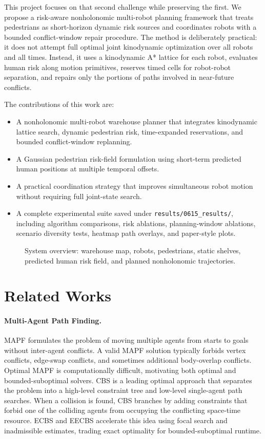 \documentclass[10pt,twocolumn,letterpaper]{article}
\begin{document}
This project focuses on that second challenge while preserving the first. We propose a risk-aware nonholonomic multi-robot planning framework that treats pedestrians as short-horizon dynamic risk sources and coordinates robots with a bounded conflict-window repair procedure. The method is deliberately practical: it does not attempt full optimal joint kinodynamic optimization over all robots and all times. Instead, it uses a kinodynamic A* lattice for each robot, evaluates human risk along motion primitives, reserves timed cells for robot-robot separation, and repairs only the portions of paths involved in near-future conflicts.

The contributions of this work are:
\begin{itemize}
    \item A nonholonomic multi-robot warehouse planner that integrates kinodynamic lattice search, dynamic pedestrian risk, time-expanded reservations, and bounded conflict-window replanning.
    \item A Gaussian pedestrian risk-field formulation using short-term predicted human positions at multiple temporal offsets.
    \item A practical coordination strategy that improves simultaneous robot motion without requiring full joint-state search.
    \item A complete experimental suite saved under \texttt{results/0615\_results/}, including algorithm comparisons, risk ablations, planning-window ablations, scenario diversity tests, heatmap path overlays, and paper-style plots.
\end{itemize}

\begin{figure}[t]
    \centering
    \caption{System overview: warehouse map, robots, pedestrians, static shelves, predicted human risk field, and planned nonholonomic trajectories.}
    \label{fig:system_overview}
\end{figure}

\section{Related Works}
\paragraph{Multi-Agent Path Finding.}
MAPF formulates the problem of moving multiple agents from starts to goals without inter-agent conflicts. A valid MAPF solution typically forbids vertex conflicts, edge-swap conflicts, and sometimes additional body-overlap conflicts. Optimal MAPF is computationally difficult, motivating both optimal and bounded-suboptimal solvers. CBS is a leading optimal approach that separates the problem into a high-level constraint tree and low-level single-agent path searches. When a collision is found, CBS branches by adding constraints that forbid one of the colliding agents from occupying the conflicting space-time resource. ECBS and EECBS accelerate this idea using focal search and inadmissible estimates, trading exact optimality for bounded-suboptimal runtime.
\end{document}
